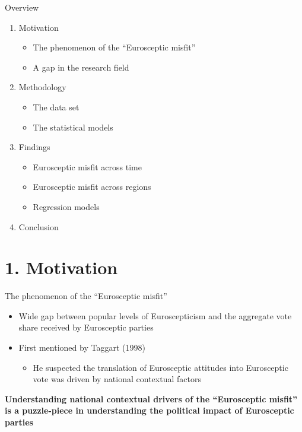 \begin{frame}{Overview}

\begin{enumerate}
\def\labelenumi{\arabic{enumi}.}
\tightlist
\item
  Motivation

  \begin{itemize}
  \tightlist
  \item
    The phenomenon of the ``Eurosceptic misfit''
  \item
    A gap in the research field
  \end{itemize}
\item
  Methodology

  \begin{itemize}
  \tightlist
  \item
    The data set
  \item
    The statistical models
  \end{itemize}
\item
  Findings

  \begin{itemize}
  \tightlist
  \item
    Eurosceptic misfit across time
  \item
    Eurosceptic misfit across regions
  \item
    Regression models
  \end{itemize}
\item
  Conclusion
\end{enumerate}

\end{frame}

\section{1. Motivation}\label{motivation}

\begin{frame}{The phenomenon of the ``Eurosceptic misfit''}

\begin{itemize}
\tightlist
\item
  Wide gap between popular levels of Euroscepticism and the aggregate
  vote share received by Eurosceptic parties
\item
  First mentioned by Taggart (1998)

  \begin{itemize}
  \tightlist
  \item
    He suspected the translation of Eurosceptic attitudes into
    Eurosceptic vote was driven by national contextual factors
  \end{itemize}
\end{itemize}

\textbf{Understanding national contextual drivers of the ``Eurosceptic
misfit'' is a puzzle-piece in understanding the political impact of
Eurosceptic parties}

\end{frame}

